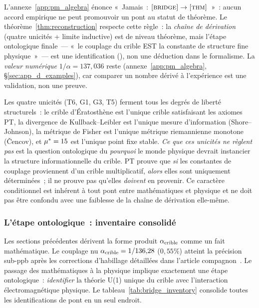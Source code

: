 \documentclass[12pt,a4paper]{article}
\begin{document}
\begin{remarque}\mBR
\label{rem:bridge_vs_thm}
L'annexe~\ref{app:pm_algebra} énonce «~Jamais~:
$\textnormal{\textsc{[bridge]}} \to \textnormal{\textsc{[thm]}}$~»~: aucun accord empirique ne peut
promouvoir un pont au statut de théorème. Le
théorème~\ref{thm:reconstruction} respecte cette règle~: la
\emph{chaîne de dérivation} (quatre unicités + limite inductive)
est de niveau théorème, mais l'étape ontologique finale~--- «~le
couplage du crible EST la constante de structure fine physique~»~---
est une identification (\BRIDGETAG), non une déduction dans le
formalisme. La \emph{valeur numérique} $1/\alpha = 137{,}036$
reste \VALTAG{} (annexe~\ref{app:pm_algebra},
\S\ref{sec:app_d_examples}), car comparer un nombre dérivé à
l'expérience est une validation, non une preuve.
\end{remarque}

\begin{remarque}\mBR
\label{rem:ontological_caveat}
Les quatre unicités (T6, G1, G3, T5) ferment tous les degrés de
liberté structurels~: le crible d'Ératosthène est l'unique crible
satisfaisant les axiomes PT, la divergence de Kullback--Leibler est
l'unique mesure d'information (Shore--Johnson), la métrique de
Fisher est l'unique métrique riemannienne monotone (\v{C}encov),
et ${\mu^{*}} = 15$ est l'unique point fixe stable. \emph{Ce que ces
unicités ne règlent pas} est la question ontologique du
\emph{pourquoi} le monde physique devrait instancier la structure
informationnelle du crible. PT prouve que \emph{si} les constantes
de couplage proviennent d'un crible multiplicatif, \emph{alors}
elles sont uniquement déterminées~; il ne prouve pas qu'elles
\emph{doivent} en provenir. Ce caractère conditionnel est inhérent
à tout pont entre mathématiques et physique et ne doit pas être
confondu avec une faiblesse de la chaîne de dérivation elle-même.
\end{remarque}

\subsubsection{L'étape ontologique~: inventaire consolidé}
\label{sec:ch9_ontological_inventory}

Les sections précédentes dérivent la forme produit
$\alpha_{\rm crible}$ comme un fait mathématique. Le couplage nu
$\alpha_{\rm crible} = 1/136{,}28$ ($0{,}55\%$) atteint la précision
sub-ppb après les corrections d'habillage détaillées dans l'article
compagnon~\cite{companion_physics}. Le passage des mathématiques à
la physique implique exactement une étape ontologique~:
\emph{identifier} la théorie U(1) unique du crible avec
l'interaction électromagnétique physique. Le
tableau~\ref{tab:bridge_inventory} consolide toutes les
identifications de pont en un seul endroit.
\end{document}
